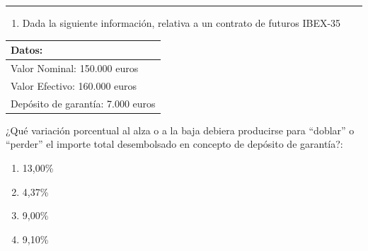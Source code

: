 \documentclass[
  letterpaper,
  DIV=11,
  numbers=noendperiod]{scrreprt}
\providecommand{\tightlist}{%
  \setlength{\itemsep}{0pt}\setlength{\parskip}{0pt}}\usepackage{longtable,booktabs,array}
\begin{document}
\begin{center}\rule{0.5\linewidth}{0.5pt}\end{center}

\begin{enumerate}
\def\labelenumi{\arabic{enumi}.}
\setcounter{enumi}{46}
\tightlist
\item
  Dada la siguiente información, relativa a un contrato de futuros
  IBEX-35
\end{enumerate}

\begin{longtable}[]{@{}l@{}}
\toprule()
\textbf{Datos:} \\
\midrule()
\endhead
Valor Nominal: 150.000 euros \\
Valor Efectivo: 160.000 euros \\
Depósito de garantía: 7.000 euros \\
\bottomrule()
\end{longtable}

¿Qué variación porcentual al alza o a la baja debiera producirse para
``doblar'' o ``perder'' el importe total desembolsado en concepto de
depósito de garantía?:

\begin{enumerate}
\def\labelenumi{\alph{enumi})}
\item
  13,00\%
\item
  4,37\%
\item
  9,00\%
\item
  9,10\%
\end{enumerate}
\end{document}
